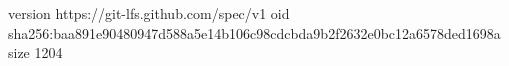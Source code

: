 version https://git-lfs.github.com/spec/v1
oid sha256:baa891e90480947d588a5e14b106c98cdcbda9b2f2632e0bc12a6578ded1698a
size 1204
